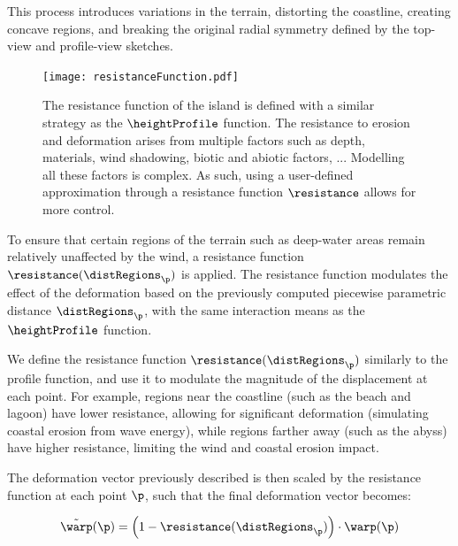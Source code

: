 This process introduces variations in the terrain, distorting the coastline, creating concave regions, and breaking the original radial symmetry defined by the top-view and profile-view sketches.


\begin{figure}
    \texttt{[image: resistanceFunction.pdf]}
    \caption{The resistance function of the island is defined with a similar strategy as the $\heightProfile$ function. The resistance to erosion and deformation arises from multiple factors such as depth, materials, wind shadowing, biotic and abiotic factors, ... Modelling all these factors is complex. As such, using a user-defined approximation through a resistance function $\resistance$ allows for more control.}
    \label{fig:coral-island-resistance-function}
\end{figure}

To ensure that certain regions of the terrain such as deep-water areas remain relatively unaffected by the wind, a resistance function $\resistance(\distRegions_\p)$ is applied. The resistance function modulates the effect of the deformation based on the previously computed piecewise parametric distance $\distRegions_\p$, with the same interaction means as the $\heightProfile$ function.

We define the resistance function $\resistance(\distRegions_\p)$ similarly to the profile function, and use it to modulate the magnitude of the displacement at each point. For example, regions near the coastline (such as the beach and lagoon) have lower resistance, allowing for significant deformation (simulating coastal erosion from wave energy), while regions farther away (such as the abyss) have higher resistance, limiting the wind and coastal erosion impact.

The deformation vector previously described is then scaled by the resistance function at each point $\p$, such that the final deformation vector becomes:

\begin{align}
\Tilde{\warp}(\p) = \left(1 - \resistance(\distRegions_\p) \right) \cdot \warp(\p)
\end{align}



